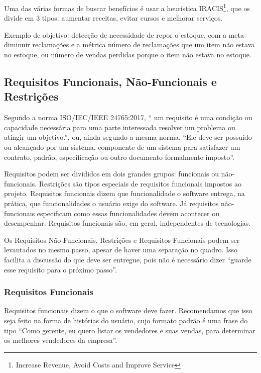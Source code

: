 \documentclass[a4]{report}
\begin{document}
Uma das várias formas de buscar benefícios é usar a heurística IRACIS\footnote{Increase Revenue, Avoid Costs and Improve Service}, que os divide em 3 tipos: aumentar receitas, evitar cursos e melhorar serviços.

Exemplo de objetivo: detecção de necessidade de repor o estoque, com a meta diminuir reclamações e a métrica número de reclamações que um item não estava no estoque, ou número de vendas perdidas porque o item não estava no estoque.

\subsection{Requisitos Funcionais, Não-Funcionais e Restrições}

Segundo a norma ISO/IEC/IEEE 24765:2017, `` um requisito é uma condição ou capacidade necessária para uma parte interessada resolver um problema ou atingir um objetivo.'', ou, ainda segundo a mesma norma, ``Ele deve ser possuído ou alcançado por um sistema, componente de um sistema para satisfazer um contrato, padrão, especificação ou outro documento formalmente imposto''\citep{IEEE:24765:2017}.

Requisitos podem ser divididos em dois grandes grupos: funcionais ou não-funcionais. Restrições são tipos especiais de requisitos funcionais impostos ao projeto. Requisitos funcionais dizem que funcionalidade o software entrega, na prática, que funcionalidades o usuário exige do software. Já requisitos não-funcionais especificam como essas funcionalidades devem acontecer ou desempenhar. Requisitos funcionais são, em geral, independentes de tecnologias.

Os Requisitos Não-Funcionais, Restrições e Requisitos Funcionais podem ser levantados no mesmo passo, apesar de haver uma separação no quadro. Isso facilita a discussão do que deve ser entregue, pois não é necessário dizer ``guarde esse requisito para o próximo passo''.

\subsubsection{Requisitos Funcionais}

Requisitos funcionais dizem o que o software deve fazer. Recomendamos que isso seja feito na forma de histórias do usuário, cujo formato padrão é uma frase do tipo ``Como gerente, eu quero listar os vendedores e suas vendas, para determinar os melhores vendedores da empresa''\citep{mike:user:stories}.
\end{document}
